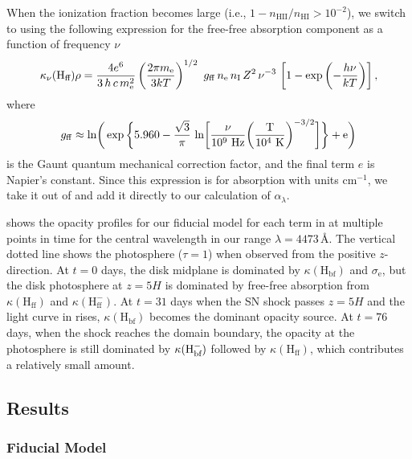 When the ionization fraction becomes large (i.e., $1 - n_\text{HII}/n_\text{HI}>10^{-2}$), we switch to using the following expression for the free-free absorption component as a function of frequency $\nu$
\begin{equation}
	\kappa_{\nu}(\text{H}_\text{ff}) \rho = \frac{4e^6}{3\, h\, c\, m_{\rm e}^2} \left( \frac{2\pi m_{\rm e}}{3kT} \right)^{1/2} \ g_{\rm ff}\, n_{\rm e}\, n_{\rm I}\, Z^2\, \nu^{-3}\,\left[ 1 - \exp \left(-\frac{h\nu}{kT}\right) \right],
\end{equation}
where
\begin{equation}
    g_{\rm ff} \approx \rm{ln} \bigg( \exp \bigg\{ 5.960 - \frac{\sqrt{3}}{\pi} \ ln \bigg[ \frac{\nu}{10^9\ \rm{Hz}} \bigg( \frac{T}{10^4\ \rm{K}} \bigg)^{-3/2} \bigg] \bigg\} + e \bigg)
\end{equation}
is the Gaunt quantum mechanical correction factor, and the final term $e$ is Napier's constant.
Since this expression is for absorption with units cm$^{-1}$, we take it out of  and add it directly to our calculation of $\alpha_\lambda$. 

 shows the opacity profiles for our fiducial model  for each term in  at multiple points in time for the central wavelength in our range $\lambda=4473\,\text{\AA}$.
The vertical dotted line shows the photosphere ($\tau=1$) when observed from the positive $z$-direction.
At $t=0$ days, the disk midplane is dominated by $\kappa(\text{H}_\text{bf})$ and $\sigma_\text{e}$, but the disk photosphere at $z=5H$ is dominated by free-free absorption from $\kappa(\text{H}_\text{ff})$ and $\kappa(\text{H}_\text{ff}^-)$.
At $t=31$ days when the SN shock passes $z=5H$ and the light curve in  rises, $\kappa(\text{H}_\text{bf})$ becomes the dominant opacity source.
At $t=76$ days, when the shock reaches the domain boundary, the opacity at the photosphere is still dominated by $\kappa({\rm H}^-_\text{bf})$ followed by $\kappa(\text{H}_\text{ff})$, which contributes a relatively small amount.


\subsection{Results} \label{sec:results}

\subsubsection{Fiducial Model} \label{sec:fiducial-results}

